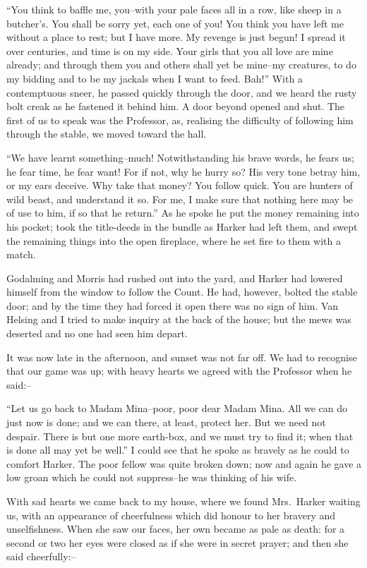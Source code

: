 \documentclass[12pt,openright]{book}
\begin{document}
“You think to baffle me, you–with your pale faces all in a row, like sheep in a butcher’s. You shall be sorry yet, each one of you! You think you have left me without a place to rest; but I have more. My revenge is just begun! I spread it over centuries, and time is on my side. Your girls that you all love are mine already; and through them you and others shall yet be mine–my creatures, to do my bidding and to be my jackals when I want to feed. Bah!” With a contemptuous sneer, he passed quickly through the door, and we heard the rusty bolt creak as he fastened it behind him. A door beyond opened and shut. The first of us to speak was the Professor, as, realising the difficulty of following him through the stable, we moved toward the hall.

“We have learnt something–much! Notwithstanding his brave words, he fears us; he fear time, he fear want! For if not, why he hurry so? His very tone betray him, or my ears deceive. Why take that money? You follow quick. You are hunters of wild beast, and understand it so. For me, I make sure that nothing here may be of use to him, if so that he return.” As he spoke he put the money remaining into his pocket; took the title-deeds in the bundle as Harker had left them, and swept the remaining things into the open fireplace, where he set fire to them with a match.

Godalming and Morris had rushed out into the yard, and Harker had lowered himself from the window to follow the Count. He had, however, bolted the stable door; and by the time they had forced it open there was no sign of him. Van Helsing and I tried to make inquiry at the back of the house; but the mews was deserted and no one had seen him depart.

It was now late in the afternoon, and sunset was not far off. We had to recognise that our game was up; with heavy hearts we agreed with the Professor when he said:–

“Let us go back to Madam Mina–poor, poor dear Madam Mina. All we can do just now is done; and we can there, at least, protect her. But we need not despair. There is but one more earth-box, and we must try to find it; when that is done all may yet be well.” I could see that he spoke as bravely as he could to comfort Harker. The poor fellow was quite broken down; now and again he gave a low groan which he could not suppress–he was thinking of his wife.

With sad hearts we came back to my house, where we found Mrs. Harker waiting us, with an appearance of cheerfulness which did honour to her bravery and unselfishness. When she saw our faces, her own became as pale as death: for a second or two her eyes were closed as if she were in secret prayer; and then she said cheerfully:–
\end{document}
